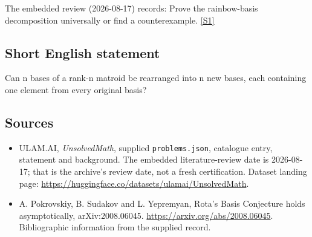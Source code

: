 \documentclass[11pt,a4paper]{article}
\newcommand{\sref}[2]{\hyperlink{source:#1:#2}{[S#2]}}
\begin{document}
The embedded review (2026-08-17) records: Prove the rainbow-basis decomposition universally or find a counterexample. \sref{statement}{1}

\subsection{Short English statement}

Can n bases of a rank-n matroid be rearranged into n new bases, each containing one element from every original basis?

\subsection{Sources}

{\small

\begin{itemize}

\item[\hypertarget{source:statement:1}{S1}] ULAM.AI, \emph{UnsolvedMath}, supplied \texttt{problems.json}, catalogue entry, statement and background. The embedded literature-review date is 2026-08-17; that is the archive’s review date, not a fresh certification. Dataset landing page: \url{https://huggingface.co/datasets/ulamai/UnsolvedMath}.

\item[\hypertarget{source:statement:2}{S2}] A. Pokrovskiy, B. Sudakov and L. Yepremyan, Rota's Basis Conjecture holds asymptotically, arXiv:2008.06045. \url{https://arxiv.org/abs/2008.06045}. Bibliographic information from the supplied record.

\end{itemize}

}

\label{end:statement}
\end{document}
